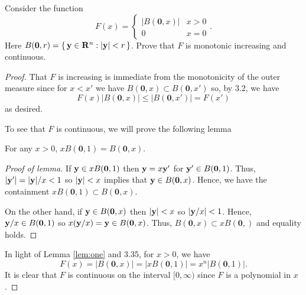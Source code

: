 \begin{problem}
Consider the function
\[
F(x)=
\begin{cases}
|B(\mathbf{0},x)|&x>0\\
0&x=0
\end{cases}.
\]
Here
$B(\mathbf{0},r)=\left\{\,\mathbf{y}\in\mathbf{R}^n:|\mathbf{y}|<r\,\right\}$. Prove
that $F$ is monotonic increasing and continuous.
\end{problem}
\begin{proof}
That $F$ is increasing is immediate from the monotonicity of the outer
measure since for $x<x'$ we have $B(\mathbf{0},x)\subset B(\mathbf{0},x')$
so, by 3.2, we have
\[
F(x)\left|B(\mathbf{0},x)\right|\leq\left|B(\mathbf{0},x')\right|=F(x')
\]
as desired.

To see that $F$ is continuous, we will prove the following lemma
\begin{lemma}
\label{lem:one}
For any $x>0$, $xB(\mathbf{0},1)=B(\mathbf{0},x)$.
\end{lemma}
\begin{proof}[Proof of lemma]
\renewcommand\qedsymbol{$\clubsuit$}
If $\mathbf{y}\in xB(\mathbf{0},1)$ then $\mathbf{y}=x\mathbf{y}'$ for $\mathbf{y}'\in
B(\mathbf{0},1)$. Thus, $|\mathbf{y}'|=|\mathbf{y}|/x<1$ so $|\mathbf{y}|<x$ implies that
$\mathbf{y}\in B(\mathbf{0},x)$. Hence, we have the containment
$xB(\mathbf{0},1)\subset B(\mathbf{0},x)$.

On the other hand, if $\mathbf{y}\in B(\mathbf{0},x)$ then $|\mathbf{y}|<x$ so
$\left|\mathbf{y}/x\right|<1$. Hence, $\mathbf{y}/x\in B(\mathbf{0},1)$ so
$x(\mathbf{y}/x)=\mathbf{y}\in B(\mathbf{0},x)$. Thus, $B(\mathbf{0},x)\subset
xB(\mathbf{0},)$ and equality holds.
\end{proof}
In light of Lemma \ref{lem:one} and 3.35, for $x>0$, we have
\begin{equation}
\label{eq:scale-map}
F(x)=\left|B(\mathbf{0},x)\right|
=\left|xB(\mathbf{0},1)\right|
=x^n\left|B(\mathbf{0},1)\right|.
\end{equation}
It is clear that $F$ is continuous on the interval $[0,\infty)$ since $F$
is a polynomial in $x$.
\end{proof}

